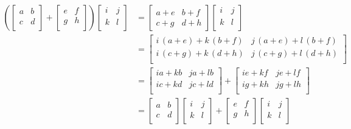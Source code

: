 \documentclass[MathsNotesBase.tex]{subfiles}
\begin{document}
{		\begin{align*}
			\left(
			\begin{bmatrix}
			a & b \\
			c & d \\
			\end{bmatrix}
			+
			\begin{bmatrix}
			e & f \\
			g & h \\
			\end{bmatrix}
			\right)
			\begin{bmatrix}
			i & j \\
			k & l \\
			\end{bmatrix}
			&=
			\begin{bmatrix}
			a+e & b+f\\
			c+g & d+h
			\end{bmatrix}
			\begin{bmatrix}
			i & j \\
			k & l \\
			\end{bmatrix}
			\\
			&=
			\begin{bmatrix}
			i\,{\left(a+e\right)}+k\,{\left(b+f\right)} & j\,{\left(a+e\right)}+l\,{\left(b+f\right)}\\
			i\,{\left(c+g\right)}+k\,{\left(d+h\right)} & j\,{\left(c+g\right)}+l\,{\left(d+h\right)}\\
			\end{bmatrix}
			\\
			&=
			\begin{bmatrix}
			ia + kb & ja + lb\\
			ic + kd & jc + ld\\
			\end{bmatrix}
			+
			\begin{bmatrix}
			ie + kf & je + lf\\
			ig + kh & jg + lh\\
			\end{bmatrix}
			\\
			&=
			\begin{bmatrix}
			a & b \\
			c & d \\
			\end{bmatrix}
			\begin{bmatrix}
			i & j \\
			k & l \\
			\end{bmatrix}
			+
			\begin{bmatrix}
			e & f \\
			g & h \\
			\end{bmatrix}
			\begin{bmatrix}
			i & j \\
			k & l \\
			\end{bmatrix}
		\end{align*}
		
}
\end{document}

